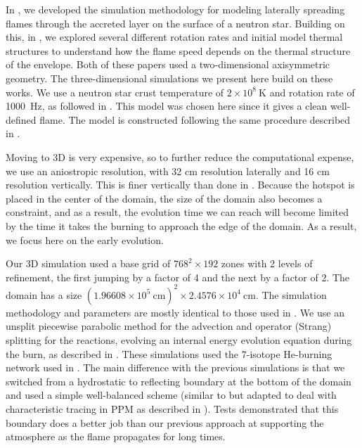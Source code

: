 \documentclass[twocolumn,times,tighten]{aastex631}
\begin{document}
In \citet{eiden:2020}, we developed the simulation methodology for
modeling laterally spreading flames through the accreted layer on the
surface of a neutron star.  Building on this, in \citet{harpole:2021},
we explored several different rotation rates and initial model thermal
structures to understand how the flame speed depends on the thermal
structure of the envelope.  Both of these papers used a
two-dimensional axisymmetric geometry.  The three-dimensional
simulations we present here build on these works.  We use a neutron
star crust temperature of $2\times 10^8~\mathrm{K}$ and rotation rate
of 1000~Hz, as followed in \citet{harpole:2021}.  This model was
chosen here since it gives a clean well-defined flame.  The model is
constructed following the same procedure described in
\citet{eiden:2020,harpole:2021}.

Moving to 3D is very expensive, so to further reduce the computational
expense, we use an aniostropic resolution, with 32 cm resolution laterally and 16
cm resolution vertically.  This is finer vertically than done in
\citet{harpole:2021}.  Because
the hotspot is placed in the center of the domain, the size of the
domain also becomes a constraint, and as a result, the evolution time
we can reach will become limited by the time it takes the burning to
approach the edge of the domain.  As a result, we focus here on the
early evolution.

Our 3D simulation used a base grid of $768^2 \times 192$ zones with 2
levels of refinement, the first jumping by a factor of 4 and the next
by a factor of 2.  The domain has a size $(1.96608\times
10^5~\mathrm{cm})^2 \times 2.4576\times 10^4~\mathrm{cm}$.  The simulation methodology and
parameters are mostly identical to those used in \citet{harpole:2021}.
We use an unsplit piecewise parabolic method \citep{ppmunsplit,millercolella:2002} for the
advection and operator (Strang) splitting for the reactions, evolving
an internal energy evolution equation during the burn, as described in
\citet{strang_rnaas}.  These simulations used the 7-isotope He-burning
network used in \citet{eiden:2020}.  The main difference with the previous
simulations is that we switched from a hydrostatic to reflecting
boundary at the bottom of the domain and used a simple well-balanced
scheme (similar to \citealt{kappeli:2016} but adapted to deal with
characteristic tracing in PPM as described in \citealt{ppm-hse}).
Tests demonstrated that this boundary does a better job than our
previous approach at supporting the atmosphere as the flame propagates
for long times.
\end{document}

